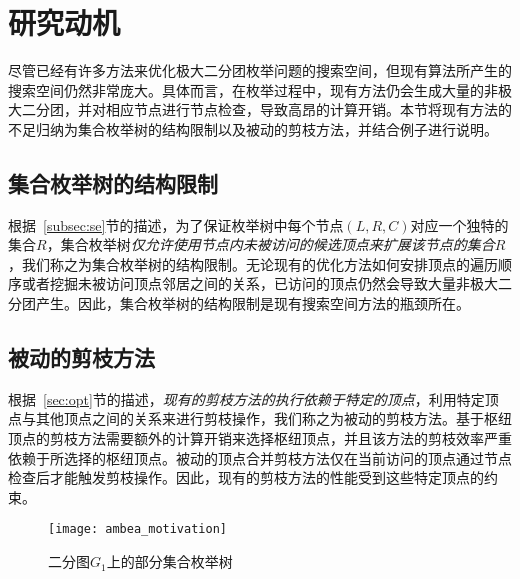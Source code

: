     


\section{研究动机}
\label{sec:ambea_motivation}

尽管已经有许多方法来优化极大二分团枚举问题的搜索空间，但现有算法所产生的搜索空间仍然非常庞大。具体而言，在枚举过程中，现有方法仍会生成大量的非极大二分团，并对相应节点进行节点检查，导致高昂的计算开销。本节将现有方法的不足归纳为集合枚举树的结构限制以及被动的剪枝方法，并结合例子进行说明。


\subsection{集合枚举树的结构限制}

根据~\ref{subsec:se}节的描述，为了保证枚举树中每个节点$(L,R,C)$对应一个独特的集合$R$，集合枚举树\emph{仅允许使用节点内未被访问的候选顶点来扩展该节点的集合$R$}，我们称之为集合枚举树的结构限制。无论现有的优化方法如何安排顶点的遍历顺序或者挖掘未被访问顶点邻居之间的关系，已访问的顶点仍然会导致大量非极大二分团产生。因此，集合枚举树的结构限制是现有搜索空间方法的瓶颈所在。

\subsection{被动的剪枝方法}

根据~\ref{sec:opt}节的描述，\emph{现有的剪枝方法的执行依赖于特定的顶点}，利用特定顶点与其他顶点之间的关系来进行剪枝操作，我们称之为被动的剪枝方法。基于枢纽顶点的剪枝方法需要额外的计算开销来选择枢纽顶点，并且该方法的剪枝效率严重依赖于所选择的枢纽顶点。被动的顶点合并剪枝方法仅在当前访问的顶点通过节点检查后才能触发剪枝操作。因此，现有的剪枝方法的性能受到这些特定顶点的约束。

\begin{figure} [h]
  \centering
  \texttt{[image: ambea\_motivation]}
  \caption{二分图$G_1$上的部分集合枚举树}
  \label{fig:ambea_motivation}
\end{figure}

